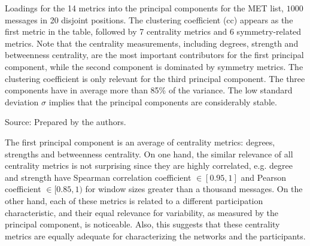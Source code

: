 \begin{table}[!h]
\caption{Loadings for the 14 metrics into the principal components for the MET list, $1000$ messages in 20 disjoint positions. The clustering coefficient (cc) appears as the first metric in the table, followed by 7 centrality metrics and 6 symmetry-related metrics. Note that the centrality measurements, including degrees, strength and betweenness centrality, are the most important contributors for the first principal component, while the second component is dominated by symmetry metrics. The clustering coefficient is only relevant for the third principal component. The three components have in average more than 85\% of the variance.
The low standard deviation $\sigma$ implies that the principal components are considerably stable.}
\footnotesize

\label{tab:pcainin}
\begin{flushleft}
		Source: Prepared by the authors.\
\end{flushleft}
\end{table}

The first principal component is an average of centrality metrics:
degrees, strengths and betweenness centrality.
On one hand, the similar relevance of all centrality metrics is not surprising since they are highly correlated,
e.g. degree and strength have Spearman correlation coefficient $\in [0.95,1]$ 
and Pearson coefficient $\in [0.85,1)$ for window sizes greater than a thousand messages.
On the other hand, each of these metrics is related to a different participation characteristic,
and their equal relevance for variability,
as measured by the principal component, is noticeable.
Also, this suggests that these centrality metrics 
are equally adequate for characterizing the networks
and the participants.

